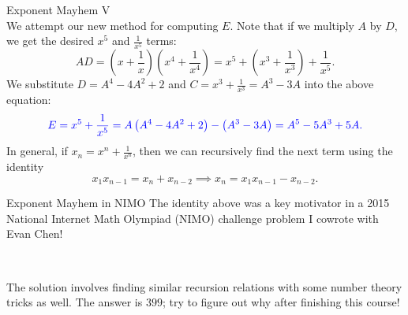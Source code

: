 \documentclass[xcolor=dvipsnames, fontsize=11pt, %
pagesize, %
parskip=half-, t]{beamer}
\begin{document}
\begin{frame}{Exponent Mayhem V}
	 ~\\	
	We attempt our new method for computing $E$. Note that if we multiply $A$ by $D$, we get the desired $x^5$ and $\frac{1}{x^5}$ terms: $$AD=\left(x+\frac{1}{x}\right)\left(x^4+\frac{1}{x^4}\right)=x^5+\left(x^3+\frac{1}{x^3}\right)+\frac{1}{x^5}.$$  
	We substitute $D=A^4-4A^2+2$ and $C=x^3+\frac{1}{x^3}=A^3-3A$ into the above equation: $$\color{blue} E=x^5+\frac{1}{x^5}=A\left(A^4-4A^2+2\right)-\left(A^3-3A\right)=A^5-5A^3+5A.$$In general, if $x_n=x^n+\frac{1}{x^n}$, then we can recursively find the next term using the identity $$x_1x_{n-1}=x_n+x_{n-2}\implies x_n=x_1x_{n-1}-x_{n-2}.$$ 
\end{frame}

\begin{frame}{Exponent Mayhem in NIMO}
	The identity above was a key motivator in a 2015 National Internet Math Olympiad (NIMO) challenge problem I cowrote with Evan Chen! \medskip 
	
	 ~\\ \medskip
	
	The solution involves finding similar recursion relations with some number theory tricks as well. The answer is $399$; try to figure out why after finishing this course!
\end{frame}
\end{document}
